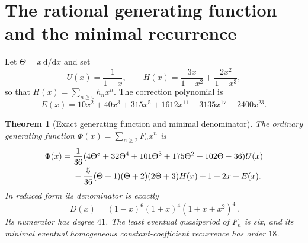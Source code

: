 \documentclass[11pt,a4paper]{article}
\numberwithin{equation}{section}
\newtheorem{theorem}{Theorem}[section]
\theoremstyle{definition}
\begin{document}
\section{The rational generating function and the minimal recurrence}\label{pyf:sec:gf}

Let $\Theta=x\,\mathrm d/\mathrm dx$ and set
\begin{equation}\label{pyf:eq:Hperiod}
U(x)=\frac1{1-x},\qquad
H(x)=\frac{3x}{1-x^2}+\frac{2x^2}{1-x^3},
\end{equation}
so that $H(x)=\sum_{n\geq0}h_nx^n$. The correction polynomial is
\begin{equation}\label{pyf:eq:Epoly}
E(x)=10x^2+40x^3+315x^5+1612x^{11}+3135x^{17}+2400x^{23}.
\end{equation}

\begin{theorem}[Exact generating function and minimal denominator]\label{pyf:thm:gf}
The ordinary generating function $\Phi(x)=\sum_{n\geq2}F_nx^n$ is
\begin{align}\label{pyf:eq:GF}
\Phi(x)={}&\frac1{36}
 (4\Theta^5+32\Theta^4+101\Theta^3+175\Theta^2+102\Theta-36)U(x)\notag\\
&-\frac5{36}(\Theta+1)(\Theta+2)(2\Theta+3)H(x)
 +1+2x+E(x).
\end{align}
In reduced form its denominator is exactly
\begin{equation}\label{pyf:eq:D}
\boxed{\ D(x)=(1-x)^6(1+x)^4(1+x+x^2)^4\ }.
\end{equation}
Its numerator has degree $41$. The least eventual quasiperiod of $F_n$ is
six, and its minimal eventual homogeneous constant-coefficient recurrence
has order $18$.
\end{theorem}
\end{document}
